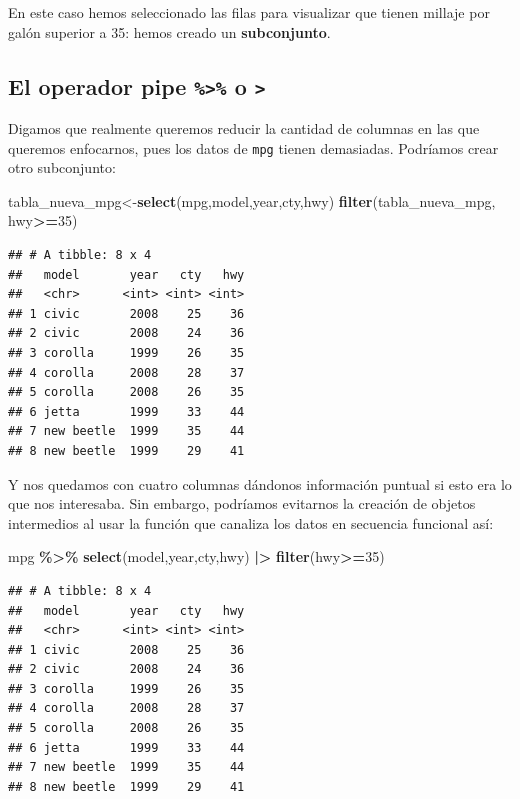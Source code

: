 \documentclass[
]{article}
\newenvironment{Shaded}{\begin{snugshade}}{\end{snugshade}}
\newcommand{\DecValTok}[1]{\textcolor[rgb]{0.00,0.00,0.81}{#1}}
\newcommand{\FunctionTok}[1]{\textcolor[rgb]{0.13,0.29,0.53}{\textbf{#1}}}
\newcommand{\NormalTok}[1]{#1}
\newcommand{\OtherTok}[1]{\textcolor[rgb]{0.56,0.35,0.01}{#1}}
\newcommand{\SpecialCharTok}[1]{\textcolor[rgb]{0.81,0.36,0.00}{\textbf{#1}}}
\begin{document}
En este caso hemos seleccionado las filas para visualizar que tienen
millaje por galón superior a 35: hemos creado un \textbf{subconjunto}.

\subsection{\texorpdfstring{El operador pipe \texttt{\%\textgreater{}\%}
o
\texttt{\textbar{}\textgreater{}}}{El operador pipe \%\textgreater\% o \textbar\textgreater{}}}\label{el-operador-pipe-o}

Digamos que realmente queremos reducir la cantidad de columnas en las
que queremos enfocarnos, pues los datos de \texttt{mpg} tienen
demasiadas. Podríamos crear otro subconjunto:

\begin{Shaded}
\begin{Highlighting}[]
\NormalTok{tabla\_nueva\_mpg}\OtherTok{\textless{}{-}}\FunctionTok{select}\NormalTok{(mpg,model,year,cty,hwy)}
\FunctionTok{filter}\NormalTok{(tabla\_nueva\_mpg, hwy}\SpecialCharTok{\textgreater{}=}\DecValTok{35}\NormalTok{) }
\end{Highlighting}
\end{Shaded}

\begin{verbatim}
## # A tibble: 8 x 4
##   model       year   cty   hwy
##   <chr>      <int> <int> <int>
## 1 civic       2008    25    36
## 2 civic       2008    24    36
## 3 corolla     1999    26    35
## 4 corolla     2008    28    37
## 5 corolla     2008    26    35
## 6 jetta       1999    33    44
## 7 new beetle  1999    35    44
## 8 new beetle  1999    29    41
\end{verbatim}

Y nos quedamos con cuatro columnas dándonos información puntual si esto
era lo que nos interesaba. Sin embargo, podríamos evitarnos la creación
de objetos intermedios al usar la función que canaliza los datos en
secuencia funcional así:

\begin{Shaded}
\begin{Highlighting}[]
\NormalTok{mpg }\SpecialCharTok{\%\textgreater{}\%} \FunctionTok{select}\NormalTok{(model,year,cty,hwy) }\SpecialCharTok{|\textgreater{}} \FunctionTok{filter}\NormalTok{(hwy}\SpecialCharTok{\textgreater{}=}\DecValTok{35}\NormalTok{)}
\end{Highlighting}
\end{Shaded}

\begin{verbatim}
## # A tibble: 8 x 4
##   model       year   cty   hwy
##   <chr>      <int> <int> <int>
## 1 civic       2008    25    36
## 2 civic       2008    24    36
## 3 corolla     1999    26    35
## 4 corolla     2008    28    37
## 5 corolla     2008    26    35
## 6 jetta       1999    33    44
## 7 new beetle  1999    35    44
## 8 new beetle  1999    29    41
\end{verbatim}
\end{document}
